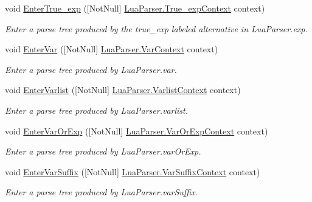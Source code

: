 \begin{DoxyCompactItemize}
void \mbox{\hyperlink{classzlua_1_1_compiler_acaa89ddcb610b21d92f1e3d574c678bf}{Enter\+True\+\_\+exp}} (\mbox{[}Not\+Null\mbox{]} \mbox{\hyperlink{classzlua_1_1_lua_parser_1_1_true__exp_context}{Lua\+Parser.\+True\+\_\+exp\+Context}} context)
\begin{DoxyCompactList}\small\item\em Enter a parse tree produced by the {\ttfamily true\+\_\+exp} labeled alternative in Lua\+Parser.\+exp. \end{DoxyCompactList}\item 
void \mbox{\hyperlink{classzlua_1_1_compiler_aa81e525edf991e9e6a3e391814d449fe}{Enter\+Var}} (\mbox{[}Not\+Null\mbox{]} \mbox{\hyperlink{classzlua_1_1_lua_parser_1_1_var_context}{Lua\+Parser.\+Var\+Context}} context)
\begin{DoxyCompactList}\small\item\em Enter a parse tree produced by Lua\+Parser.\+var. \end{DoxyCompactList}\item 
void \mbox{\hyperlink{classzlua_1_1_compiler_ad7137ae6c666bc8dedb3cd24c8b22c49}{Enter\+Varlist}} (\mbox{[}Not\+Null\mbox{]} \mbox{\hyperlink{classzlua_1_1_lua_parser_1_1_varlist_context}{Lua\+Parser.\+Varlist\+Context}} context)
\begin{DoxyCompactList}\small\item\em Enter a parse tree produced by Lua\+Parser.\+varlist. \end{DoxyCompactList}\item 
void \mbox{\hyperlink{classzlua_1_1_compiler_ab7d4a2ccfca5f520e9702eaccab9872b}{Enter\+Var\+Or\+Exp}} (\mbox{[}Not\+Null\mbox{]} \mbox{\hyperlink{classzlua_1_1_lua_parser_1_1_var_or_exp_context}{Lua\+Parser.\+Var\+Or\+Exp\+Context}} context)
\begin{DoxyCompactList}\small\item\em Enter a parse tree produced by Lua\+Parser.\+var\+Or\+Exp. \end{DoxyCompactList}\item 
void \mbox{\hyperlink{classzlua_1_1_compiler_a6d026840f7eb9bbbdbc9b279c5929e86}{Enter\+Var\+Suffix}} (\mbox{[}Not\+Null\mbox{]} \mbox{\hyperlink{classzlua_1_1_lua_parser_1_1_var_suffix_context}{Lua\+Parser.\+Var\+Suffix\+Context}} context)
\begin{DoxyCompactList}\small\item\em Enter a parse tree produced by Lua\+Parser.\+var\+Suffix. \end{DoxyCompactList}\item 

\end{DoxyCompactItemize}
